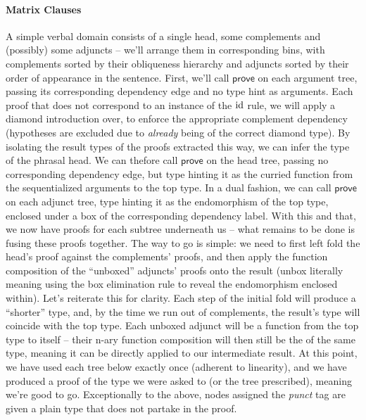 \paragraph{Matrix Clauses}
A simple verbal domain consists of a single head, some complements and (possibly) some adjuncts  -- we'll arrange them in corresponding bins, with complements sorted by their obliqueness hierarchy and adjuncts sorted by their order of appearance in the sentence.
First, we'll call $\mathsf{prove}$ on each argument tree, passing its corresponding dependency edge and no type hint as arguments.
Each proof that does not correspond to an instance of the $\mathrm{id}$ rule, we will apply a diamond introduction over, to enforce the appropriate complement dependency (hypotheses are excluded due to \textit{already} being of the correct diamond type).
By isolating the result types of the proofs extracted this way, we can infer the type of the phrasal head.
We can thefore call $\mathsf{prove}$ on the head tree, passing no corresponding dependency edge, but type hinting it as the curried function from the sequentialized arguments to the top type.
In a dual fashion, we can call $\mathsf{prove}$ on each adjunct tree, type hinting it as the endomorphism of the top type, enclosed under a box of the corresponding dependency label.
With this and that, we now have proofs for each subtree underneath us -- what remains to be done is fusing these proofs together.
The way to go is simple: we need to first left fold the head's proof against the complements' proofs, and then apply the function composition of the ``unboxed'' adjuncts' proofs onto the result (unbox literally meaning using the box elimination rule to reveal the endomorphism enclosed within).
Let's reiterate this for clarity.
Each step of the initial fold will produce a ``shorter'' type, and, by the time we run out of complements, the result's type will coincide with the top type.
Each unboxed adjunct will be a function from the top type to itself -- their n-ary function composition will then still be the of the same type, meaning it can be directly applied to our intermediate result.
At this point, we have used each tree below exactly once (adherent to linearity), and we have produced a proof of the type we were asked to (or the tree prescribed), meaning we're good to go.
Exceptionally to the above, nodes assigned the \textit{punct} tag are given a plain  type that does not partake in the proof.

